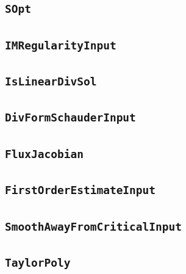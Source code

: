 \documentclass[11pt]{amsart}
\theoremstyle{definition}
\begin{document}
\subsection{\texorpdfstring{\texttt{SOpt}}{SOpt}}\label{node:SOpt}


\subsection{\texorpdfstring{\texttt{IMRegularityInput}}{IMRegularityInput}}\label{node:IMRegularityInput}


\subsection{\texorpdfstring{\texttt{IsLinearDivSol}}{IsLinearDivSol}}\label{node:IsLinearDivSol}


\subsection{\texorpdfstring{\texttt{DivFormSchauderInput}}{DivFormSchauderInput}}\label{node:DivFormSchauderInput}


\subsection{\texorpdfstring{\texttt{FluxJacobian}}{FluxJacobian}}\label{node:FluxJacobian}


\subsection{\texorpdfstring{\texttt{FirstOrderEstimateInput}}{FirstOrderEstimateInput}}\label{node:FirstOrderEstimateInput}


\subsection{\texorpdfstring{\texttt{SmoothAwayFromCriticalInput}}{SmoothAwayFromCriticalInput}}\label{node:SmoothAwayFromCriticalInput}


\subsection{\texorpdfstring{\texttt{TaylorPoly}}{TaylorPoly}}\label{node:TaylorPoly}

\end{document}

